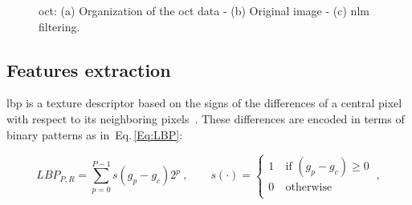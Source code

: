\begin{figure}[Hb]
  \centering
  \hspace*{\fill}
   \hfill
   \hfill
  \hspace*{\fill}
  \caption{\ac{oct}: (a) Organization of the \ac{oct} data - (b) Original image - (c) \ac{nlm} filtering.}
  \label{fig:denoise}
\end{figure}

\subsection{Features extraction}\label{subsec:feaext}

\ac{lbp} is a texture descriptor based on the signs of the differences of a central pixel with respect to its neighboring pixels~\cite{ojala2002multiresolution}. 
These differences are encoded in terms of binary patterns as in~Eq.\,\eqref{Eq:LBP}: 

\begin{equation}\label{Eq:LBP}
LBP_{P,R} = \sum_{p=0}^{P-1}s(g_{p} - g_{c})2^{p} \ , \qquad s(\cdot) = \begin{cases}
    1  & \ \text{if } (g_{p} - g_{c}) \geq 0\\
    0  & \ \text{otherwise}\\
  \end{cases} \ ,
\end{equation}

